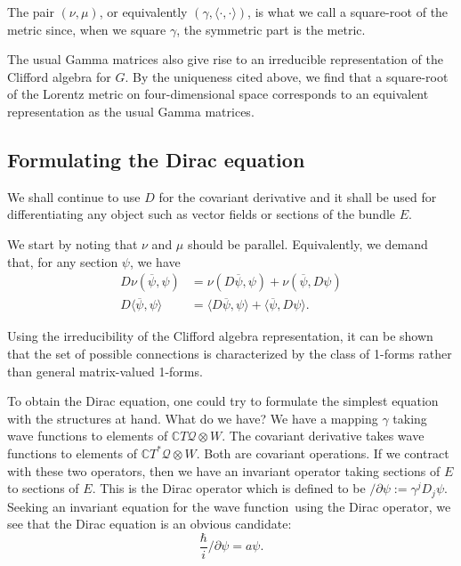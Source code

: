 \documentclass[11pt]{article}
\theoremstyle{remark}
\begin{document}
The pair $(\ensuremath{\nu}, \mu)$, or equivalently $(\gamma, \ensuremath{\langle \cdot, \cdot \rangle})$,  is
what we call a square-root of the metric since, when we square
$\gamma$, the symmetric part is the metric. 


The usual Gamma matrices also give rise to an irreducible
representation of the Clifford algebra for $G$. By the uniqueness
cited above, we find that a square-root of the Lorentz metric
on four-dimensional space corresponds to an equivalent representation
as the usual Gamma matrices. 

\subsection{Formulating the Dirac equation}

We shall continue to use $D$ for the covariant derivative and it shall
be used for differentiating any object such as vector fields or
sections of the bundle $E$. 


We start by noting that $\ensuremath{\nu}$ and $\mu$ should be
parallel. Equivalently, we demand that, for any section $\ensuremath{\psi}$, we have
\begin{align}
D \ensuremath{\nu}(\ensuremath{\overline{\ensuremath{\psi}}}, \ensuremath{\psi}) &= \ensuremath{\nu} (D \ensuremath{\overline{\ensuremath{\psi}}}, \ensuremath{\psi}) + \ensuremath{\nu}(\ensuremath{\overline{\ensuremath{\psi}}}, D \ensuremath{\psi}) \\
D \ensuremath{\langle \ensuremath{\overline{\ensuremath{\psi}}}, \ensuremath{\psi} \rangle} &= \ensuremath{\langle D \ensuremath{\overline{\ensuremath{\psi}}}, \ensuremath{\psi} \rangle} + \ensuremath{\langle \ensuremath{\overline{\ensuremath{\psi}}}, D\ensuremath{\psi} \rangle}.
\end{align}


Using the irreducibility of the Clifford algebra representation, it
can be shown that the set of possible connections is characterized by
the class of 1-forms rather than general matrix-valued 1-forms.  


To obtain the Dirac equation, one could try to formulate the simplest
equation with the structures at hand. What do we have? We have a
mapping $\gamma$ taking wave functions to elements of $\ensuremath{\mathbb{C}} \ensuremath{T \ensuremath{\mathcal{Q}}} \otimes \ensuremath{W}$. The
covariant derivative takes wave functions to elements of $\ensuremath{\mathbb{C}} \ensuremath{T^{*} \ensuremath{\mathcal{Q}}} \otimes
\ensuremath{W}$. Both are covariant operations. If we contract
with these two operators, then we have an invariant operator taking
sections of $E$ to sections of $E$. 
This is 
the Dirac operator which is defined to be $\ensuremath{ \slash \! \! \!} \partial \ensuremath{\psi} \ensuremath{:=}
\gamma^{\ensuremath{j}} D_{\ensuremath{j}} \ensuremath{\psi}$. Seeking an invariant equation for
the wave function\ using the Dirac operator, we see that the Dirac equation is
an obvious candidate:
\begin{equation}
\frac{\hbar}{i} \ensuremath{ \slash \! \! \!} \partial \ensuremath{\psi} = a \ensuremath{\psi}.
\end{equation}
\end{document}
